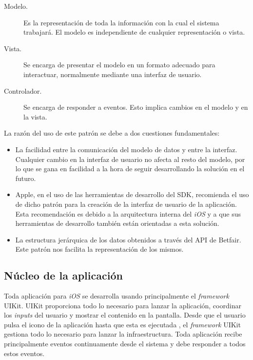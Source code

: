  \begin{description}
 	\item [Modelo.] Es la representación de toda la información con la cual el sistema trabajará. El modelo es independiente de cualquier representación o vista.
	\item [Vista.] Se encarga de presentar el modelo en un formato adecuado para interactuar, normalmente mediante una interfaz de usuario.
	\item [Controlador.] Se encarga de responder a eventos. Esto implica cambios en el modelo y en la vista.
\end{description}
 
  La razón del uso de este patrón se debe a dos cuestiones fundamentales:
\begin{itemize}
	\item La facilidad entre la comunicación del modelo de datos y entre la interfaz. Cualquier cambio en la interfaz de usuario no afecta al resto del modelo, por lo que se gana en facilidad a la hora de seguir desarrollando la solución en el futuro.
	\item Apple, en el uso de las herramientas de desarrollo del SDK, recomienda el uso de dicho patrón para la creación de la interfaz de usuario de la aplicación. Esta recomendación es debido a la arquitectura interna del \emph{iOS} y a que sus herramientas de desarrollo también están orientadas a esta solución.
	\item La estructura jerárquica de los datos obtenidos a través del API de Betfair. Este patrón nos facilita la representación de los mismos.
\end{itemize}


\subsection{Núcleo de la aplicación}
	Toda aplicación para \emph{iOS} se desarrolla usando principalmente el \emph{framework} UIKit. UIKit proporciona todo lo necesario para lanzar la aplicación, coordinar los \emph{inputs} del usuario y mostrar el contenido en la pantalla. 
	Desde que el usuario pulsa el icono de la aplicación hasta que esta es ejecutada , el \emph{framework} UIKit gestiona todo lo necesario para lanzar la infraestructura. Toda aplicación recibe principalmente eventos continuamente desde el sistema y debe responder a todos estos eventos. 
	
